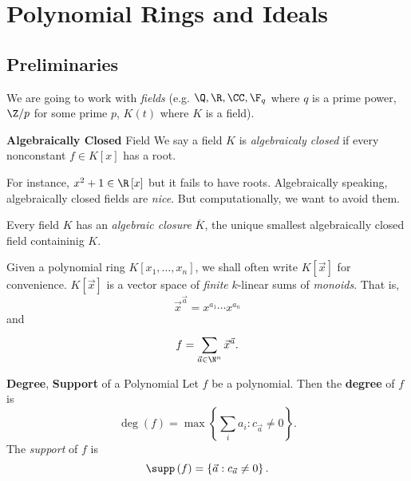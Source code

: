 \documentclass[co439]{subfiles}
\begin{document}
    \section{Polynomial Rings and Ideals}

    \subsection{Preliminaries}
    
    We are going to work with \textit{fields} (e.g. $\Q,\R,\CC,\F_q$ where $q$ is a prime power, $\Z /p$ for some prime $p$, $K\left( t \right)$ where $K$ is a field).

    \begin{definition}{\textbf{Algebraically Closed} Field}
        We say a field $K$ is \emph{algebraicaly closed} if every nonconstant $f\in K\left[ x \right]$ has a root.
    \end{definition}

    \np For instance, $x^{2}+1\in\R\left[ x \right]$ but it fails to have roots. Algebraically speaking, algebraically closed fields are \textit{nice}. But computationally, we want to avoid them.

    \begin{theorem}{}
        Every field $K$ has an \textit{algebraic closure} $\overline{K}$, the unique smallest algebraically closed field containinig $K$.
    \end{theorem}

    \rruleline

    \np Given a polynomial ring $K\left[ x_1,\ldots,x_n \right]$, we shall often write $K\left[ \vec{x} \right]$ for convenience. $K\left[ \vec{x} \right]$ is a vector space of \textit{finite} $k$-linear sums of \textit{monoids}. That is,
    \begin{equation*}
        \vec{x}^{\vec{a}} = x^{a_1}\cdots x^{a_n}
    \end{equation*}
    and
    \begin{equation*}
        f = \sum^{}_{\vec{a}\in\N^n} \vec{x}^{\vec{a}}.
    \end{equation*}


    \begin{definition}{\textbf{Degree}, \textbf{Support} of a Polynomial}
        Let $f$ be a polynomial. Then the \textbf{degree} of $f$ is
        \begin{equation*}
            \deg\left( f \right) = \max\left\lbrace \sum^{}_{i}a_i: c_{\vec{a}}\neq 0 \right\rbrace.
        \end{equation*}
        The \emph{support} of $f$ is
        \begin{equation*}
            \supp\left( f \right) = \left\lbrace \vec{a}: c_{\vec{a}}\neq 0 \right\rbrace.
        \end{equation*}
    \end{definition}
\end{document}
